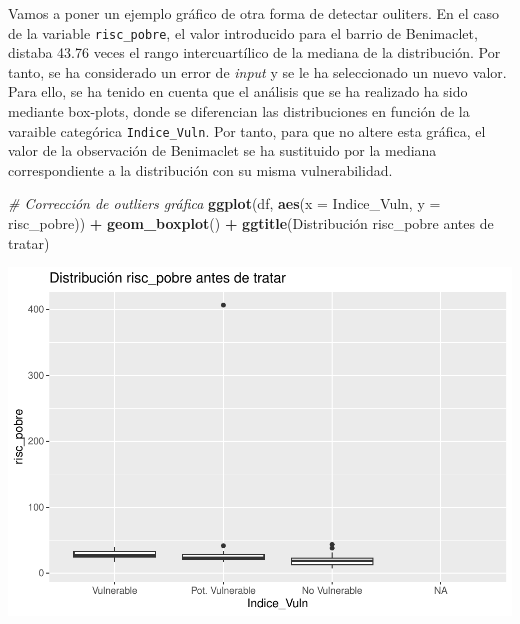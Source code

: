 \documentclass[notspecified,article,submit,moreauthors,pdftex]{Definitions/mdpi}
\newenvironment{Shaded}{\begin{snugshade}}{\end{snugshade}}
\newcommand{\AttributeTok}[1]{\textcolor[rgb]{0.13,0.29,0.53}{#1}}
\newcommand{\CommentTok}[1]{\textcolor[rgb]{0.56,0.35,0.01}{\textit{#1}}}
\newcommand{\FunctionTok}[1]{\textcolor[rgb]{0.13,0.29,0.53}{\textbf{#1}}}
\newcommand{\NormalTok}[1]{#1}
\newcommand{\SpecialCharTok}[1]{\textcolor[rgb]{0.81,0.36,0.00}{\textbf{#1}}}
\newcommand{\StringTok}[1]{\textcolor[rgb]{0.31,0.60,0.02}{#1}}
\begin{document}
Vamos a poner un ejemplo gráfico de otra forma de detectar ouliters. En
el caso de la variable \texttt{risc\_pobre}, el valor introducido para
el barrio de Benimaclet, distaba 43.76 veces el rango intercuartílico de
la mediana de la distribución. Por tanto, se ha considerado un error de
\emph{input} y se le ha seleccionado un nuevo valor. Para ello, se ha
tenido en cuenta que el análisis que se ha realizado ha sido mediante
box-plots, donde se diferencian las distribuciones en función de la
varaible categórica \texttt{Indice\_Vuln}. Por tanto, para que no altere
esta gráfica, el valor de la observación de Benimaclet se ha sustituido
por la mediana correspondiente a la distribución con su misma
vulnerabilidad.

\begin{Shaded}
\begin{Highlighting}[]
\CommentTok{\# Corrección de outliers gráfica}
\FunctionTok{ggplot}\NormalTok{(df, }\FunctionTok{aes}\NormalTok{(}\AttributeTok{x =}\NormalTok{ Indice\_Vuln, }\AttributeTok{y =}\NormalTok{ risc\_pobre)) }\SpecialCharTok{+} \FunctionTok{geom\_boxplot}\NormalTok{() }\SpecialCharTok{+} \FunctionTok{ggtitle}\NormalTok{(}\StringTok{\textquotesingle{}Distribución risc\_pobre antes de tratar\textquotesingle{}}\NormalTok{)}
\end{Highlighting}
\end{Shaded}

\begin{center}\includegraphics{./figure/unnamed-chunk-35-1} \end{center}
\end{document}
